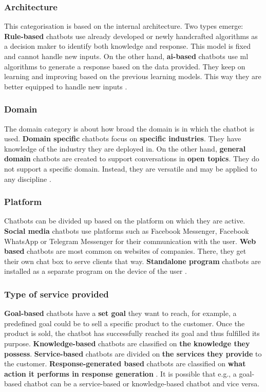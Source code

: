 \subsubsection{Architecture}
This categorisation is based on the internal architecture. Two types emerge: \textbf{Rule-based} chatbots use already developed or newly handcrafted algorithms as a decision maker to identify both knowledge and response. This model is fixed and cannot handle new inputs. On the other hand, \textbf{\acrshort{ai}-based} chatbots use \acrlong{ml} algorithms to generate a response based on the data provided. They keep on learning and improving based on the previous learning models. This way they are better equipped to handle new inputs \citep{Maroengsit2019}.

\subsubsection{Domain}
The domain category is about how broad the domain is in which the chatbot is used. \textbf{Domain specific} chatbots focus on \textbf{specific industries}. They have knowledge of the industry they are deployed in. On the other hand, \textbf{general domain} chatbots are created to support conversations in \textbf{open topics}. They do not support a specific domain. Instead, they are versatile and may be applied to any discipline \citep{Maroengsit2019}.

\subsubsection{Platform}
Chatbots can be divided up based on the platform on which they are active. \textbf{Social media} chatbots use platforms such as Facebook Messenger, Facebook WhatsApp or Telegram Messenger for their communication with the user. \textbf{Web based} chatbots are most common on websites of companies. There, they get their own chat box to serve clients that way. \textbf{Standalone program} chatbots are installed as a separate program on the device of the user \citep{CICBA2018, Maroengsit2019, Xu2017}.

\subsubsection{Type of service provided}
\textbf{Goal-based} chatbots have a \textbf{set goal} they want to reach, for example, a predefined goal could be to sell a specific product to the customer. Once the product is sold, the chatbot has successfully reached its goal and thus fulfilled its purpose. \textbf{Knowledge-based} chatbots are classified on \textbf{the knowledge they possess}. \textbf{Service-based} chatbots are divided on \textbf{the services they provide} to the customer. \textbf{Response-generated based} chatbots are classified on \textbf{what action it performs in response generation} \citep{Nuruzzaman2018}. It is possible that e.g., a goal-based chatbot can be a service-based or knowledge-based chatbot and vice versa.

